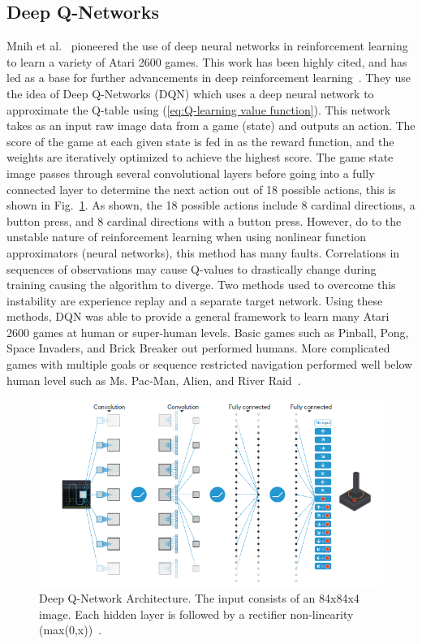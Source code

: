 \documentclass[12pt,american]{report}
\begin{document}
\subsection{Deep Q-Networks}
\label{sec:dqn}
Mnih et al.~\cite{atari} pioneered the use of deep neural networks in reinforcement learning to learn a variety of Atari 2600 games.  This work has been highly cited, and has led as a base for further advancements in deep reinforcement learning~\cite{atari}.  They use the idea of Deep Q-Networks (DQN) which uses a deep neural network to approximate the Q-table using (\ref{eq:Q-learning value function}). This network takes as an input raw image data from a game (state) and outputs an action. The score of the game at each given state is fed in as the reward function, and the weights are iteratively optimized to achieve the highest score. The game state image passes through several convolutional layers before going into a fully connected layer to determine the next action out of 18 possible actions, this is shown in Fig.~\ref{fig:DQN-atari}. As shown, the 18 possible actions include 8 cardinal directions, a button press, and 8 cardinal directions with a button press. However, do to the unstable nature of reinforcement learning when using nonlinear function approximators (neural networks), this method has many faults. Correlations in sequences of observations may cause Q-values to drastically change during training causing the algorithm to diverge. Two methods used to overcome this instability are experience replay and a separate target network. Using these methods, DQN was able to provide a general framework to learn many Atari 2600 games at human or super-human levels. Basic games such as Pinball, Pong, Space Invaders, and Brick Breaker out performed humans. More complicated games with multiple goals or sequence restricted navigation performed well below human level such as Ms. Pac-Man, Alien, and River Raid~\cite{atari}.

\begin{figure}
\centering
\includegraphics[scale=.95]{images/DQN-atari.png}
\caption{Deep Q-Network Architecture. The input consists of an 84x84x4 image. Each hidden layer is followed by a rectifier non-linearity (max(0,x))~\cite{atari}.}
\label{fig:DQN-atari}
\end{figure}
\end{document}
